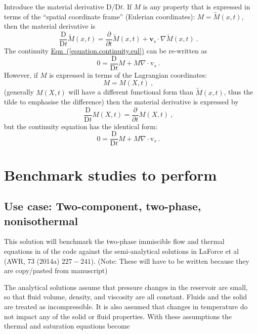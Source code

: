 \documentclass[12pt]{report}
\begin{document}
Introduce the material derivative $\mathrm{D}/\mathrm{D} t$.  If $M$
is any property that is expressed in terms of the ``spatial coordinate
frame'' (Eulerian coordinates): $M=\tilde{M}(x,t)$, then the material
derivative is
\begin{equation}
\frac{\mathrm{D}}{\mathrm{D} t}\tilde{M}(x, t) = \frac{\partial
}{\partial t}\tilde{M}(x, t) + {\mathbf{v}}_{s}\cdot \nabla
\tilde{M}(x, t)\ .
\end{equation}
The continuity
\hyperref[equation.continuity.eul]{Eqn~(\ref*{equation.continuity.eul})}
can be re-written as
\begin{equation}
0 = \frac{\mathrm{D}}{\mathrm{D} t}M + M\nabla\cdot {\mathrm{v}}_{s}
\ .
\end{equation}
However, if $M$ is expressed in terms of the Lagrangian coordinates:
\begin{equation}
M = M(X, t) \ ,
\end{equation}
(generally $M(X, t)$ will have a different functional form than
$\tilde{M}(x,t)$, thus the tilde to emphasise the difference)
then the material derivative is expressed by
\begin{equation}
\frac{\mathrm{D}}{\mathrm{D} t}M(X, t) = \frac{\partial}{\partial
  t}M(X, t) \ ,
\end{equation}
but the continuity equation has the identical form:
\begin{equation}
0 = \frac{\mathrm{D}}{\mathrm{D} t}M + M\nabla\cdot {\mathrm{v}}_{s}
\ .
\end{equation}


\chapter{Benchmark studies to perform}


\section{Use case: Two-component, two-phase, nonisothermal}

This solution will benchmark the two-phase immiscible flow and thermal equations in of the code against the semi-analytical solutions in LaForce et al (AWR, 73 (2014a) $227 - 241$). (Note: These will have to be written because they are copy/pasted from manuscript)

The analytical solutions assume that pressure changes in the reservoir are small, so that fluid volume, density, and viscosity are all constant. Fluids and the solid are treated as incompressible.  It is also assumed that changes in temperature do not impact any of the solid or fluid properties.  With these assumptions the thermal and saturation equations become
\end{document}
